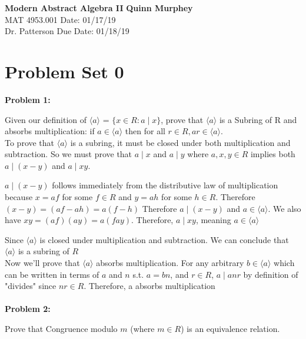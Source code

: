 \documentclass[a4paper, 11pt]{article}
\begin{document}
\noindent
\large\textbf{Modern Abstract Algebra II} \hfill \textbf{Quinn Murphey} \\
\normalsize MAT 4953.001 \hfill Date: 01/17/19 \\
Dr. Patterson \hfill Due Date: 01/18/19 \\
\noindent\makebox[\linewidth]{\rule{\paperwidth}{0.4pt}}

\section*{Problem Set 0}

\textbf{Problem 1:}

    Given our definition of  $\langle a\rangle$ = $\{ x \in R\colon a \mid x \}$,  prove that $\langle a\rangle$ is a Subring of R and absorbs multiplication: if $a \in \langle a\rangle $ then for all $r \in R, ar \in \langle a\rangle$. \\
    
    To prove that $\langle a\rangle$ is a subring, it must be closed under both multiplication and subtraction. So we must prove that $a \mid x$ and $a \mid y$ where $a,x,y \in R$ implies both $a \mid (x-y) $ and $a \mid xy$. 
    
    $a \mid (x-y)$ follows immediately from the distributive law of multiplication because $x = af$ for some $f \in R$ and $y = ah$ for some $h \in R$. Therefore $\left( x-y\right)= \left( af-ah\right)= a\left(f-h\right) $ Therefore $a \mid (x-y)$ and $a \in \langle a\rangle$. We also have $xy = (af)(ay) = a(fay)$. Therefore, $a \mid xy$, meaning $a \in \langle a\rangle$
    
    Since $\langle a\rangle$ is closed under multiplication and subtraction. We can conclude that $\langle a\rangle$ is a subring of $R$\\
    
    Now we'll prove that $\langle a\rangle$ absorbs multiplication. For any arbitrary $b \in \langle a\rangle$ which can be written in terms of $a$ and $n$ s.t. $a=bn$, and $r \in R$, $a \mid anr$ by definition of "divides" since $nr \in R$. Therefore, a absorbs multiplication\\\\
    
\noindent\textbf{Problem 2:}
    
    Prove that Congruence modulo $m$ (where $m \in R$) is an equivalence relation.\\
    
\end{document}
